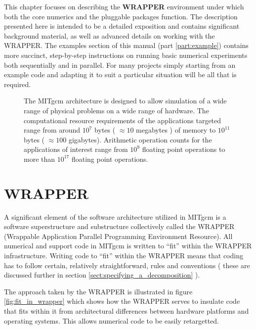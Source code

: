 This chapter focuses on describing the {\bf WRAPPER} environment under which
both the core numerics and the pluggable packages function. The description
presented here is intended to be a detailed exposition and contains significant
background material, as well as advanced details on working with the WRAPPER. 
The examples section of this manual (part \ref{part:example}) contains more
succinct, step-by-step instructions on running basic numerical
experiments both sequentially and in parallel. For many projects simply 
starting from an example code and adapting it to suit a particular situation 
will be all that is required.


\begin{figure}
\begin{center}
\end{center}
\caption{
The MITgcm architecture is designed to allow simulation of a wide 
range of physical problems on a wide range of hardware. The computational 
resource requirements of the applications targeted range from around 
$10^7$ bytes ( $\approx 10$ megabytes ) of memory to $10^{11}$ bytes
( $\approx 100$ gigabytes). Arithmetic operation counts for the applications of 
interest range from $10^{9}$ floating point operations to more than $10^{17}$ 
floating point operations.}
\label{fig:mitgcm_architecture_goals}
\end{figure}

\section{WRAPPER}

A significant element of the software architecture utilized in
MITgcm is a software superstructure and substructure collectively
called the WRAPPER (Wrappable Application Parallel Programming 
Environment Resource). All numerical and support code in MITgcm is written 
to ``fit'' within the WRAPPER infrastructure. Writing code to ``fit'' within 
the WRAPPER means that coding has to follow certain, relatively
straightforward, rules and conventions ( these are discussed further in 
section \ref{sect:specifying_a_decomposition} ).

The approach taken by the WRAPPER is illustrated in figure 
\ref{fig:fit_in_wrapper} which shows how the WRAPPER serves to insulate code 
that fits within it from architectural differences between hardware platforms 
and operating systems. This allows numerical code to be easily retargetted. 


